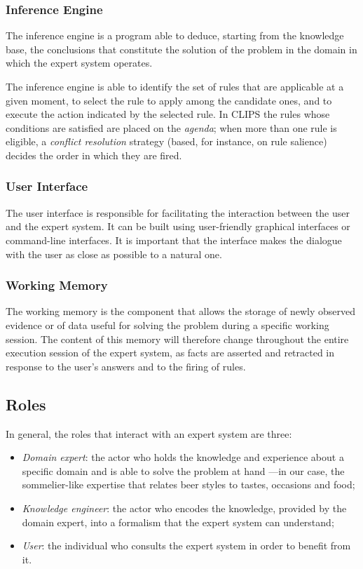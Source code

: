 \subsubsection*{Inference Engine}

The inference engine is a program able to deduce, starting from the knowledge
base, the conclusions that constitute the solution of the problem in the domain
in which the expert system operates.

The inference engine is able to identify the set of rules that are applicable at
a given moment, to select the rule to apply among the candidate ones, and to
execute the action indicated by the selected rule. In CLIPS the rules whose
conditions are satisfied are placed on the \emph{agenda}; when more than one rule
is eligible, a \emph{conflict resolution} strategy (based, for instance, on rule
salience) decides the order in which they are fired.

\subsubsection*{User Interface}

The user interface is responsible for facilitating the interaction between the
user and the expert system. It can be built using user-friendly graphical
interfaces or command-line interfaces. It is important that the interface makes
the dialogue with the user as close as possible to a natural one.

\subsubsection*{Working Memory}

The working memory is the component that allows the storage of newly observed
evidence or of data useful for solving the problem during a specific working
session. The content of this memory will therefore change throughout the entire
execution session of the expert system, as facts are asserted and retracted in
response to the user's answers and to the firing of rules.


\subsection{Roles}

In general, the roles that interact with an expert system are three:

\begin{itemize}
    \item \emph{Domain expert}: the actor who holds the knowledge and experience
    about a specific domain and is able to solve the problem at hand ---in our
    case, the sommelier-like expertise that relates beer styles to tastes,
    occasions and food;

    \item \emph{Knowledge engineer}: the actor who encodes the knowledge,
    provided by the domain expert, into a formalism that the expert system can
    understand;

    \item \emph{User}: the individual who consults the expert system in order to
    benefit from it.
\end{itemize}


